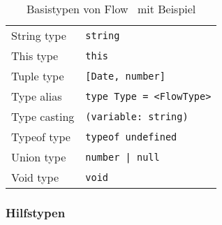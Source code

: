 \begin{table}
\begin{tabular}{@{}ll@{}}
    String type                & \texttt{string}                                          \\
    This type                  & \texttt{this}                                            \\
    Tuple type                 & \texttt{{[}Date, number{]}}                              \\
    Type alias                 & \texttt{type Type = <{}FlowType>{}}                      \\
    Type casting               & \texttt{(variable: string)}                              \\
    Typeof type                & \texttt{typeof undefined}                                \\
    Union type                 & \texttt{number | null}                                   \\
    Void type                  & \texttt{void}                                            \\
    \bottomrule
  \end{tabular}
  \caption{Basistypen von Flow~\autocite{FLOW_TYPE_ANNOTATIONS} mit Beispiel}
  \label{tab:flow-base-types}
\end{table}

\subsubsection{Hilfstypen}

